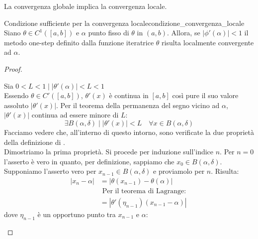 \documentclass[12pt]{report}
\newcounter{theorem}
\newcommand{\namerefl}[1]{%
	\bgroup
	\let\nmu\MakeLowercase
	\nameref{#1}\egroup}
\newcommand{\nmu}{}
\begin{document}
\begin{note}{}{}
	La convergenza globale implica la convergenza locale.
\end{note}
\begin{theorem}{\nmu Condizione sufficiente per la convergenza locale}{condizione_convergenza_locale}
	Siano $\theta \in C^1([a, b])$ e $\alpha$ punto fisso di $\theta$ in $(a, b)$. Allora, se $|\phi'(\alpha)| < 1$ il metodo one-step definito dalla funzione iteratrice $\theta$ risulta localmente convergente ad $\alpha$.
\end{theorem}
\begin{proof} \quad \\
	\begin{center}
	\end{center}
	Sia $0 < L < 1 \mid |\theta'(\alpha)| < L < 1$ \\
	Essendo $\theta \in C'([a, b])$, $\theta'(x)$ è continua in $[a, b]$ così pure il suo valore assoluto $|\theta'(x)|$. Per il teorema della permanenza del segno vicino ad $\alpha$, $|\theta'(x)|$ continua ad essere minore di $L$:
	\[
	\exists B(\alpha, \delta) \mid |\theta'(x)| < L \quad \forall x \in B(\alpha, \delta)
	\]
	Facciamo vedere che, all'interno di questo intorno, sono verificate la due proprietà della definizione di \namerefl{def:convergenza_locale}. \\
	Dimostriamo la prima proprietà. Si procede per induzione sull'indice $n$. Per $n=0$ l'asserto è vero in quanto, per definizione, sappiamo che $x_0 \in B(\alpha, \delta)$. \\
	Supponiamo l'asserto vero per $x_{n-1} \in B(\alpha, \delta)$ e proviamolo per $n$. Risulta:
	\begin{align*}
		|x_n - \alpha| &= |\theta(x_{n-1}) - \theta(\alpha)| \\
		& \text{ Per il teorema di Lagrange: } \\
		&= |\theta'(\eta_{n-1})(x_{n-1}-\alpha)|
	\end{align*}
	dove $\eta_{n-1}$ è un opportuno punto tra $x_{n-1}$ e $\alpha$:
	\begin{center}
	\begin{tikzpicture}


\end{tikzpicture}
\end{center}
\end{proof}
\end{document}
